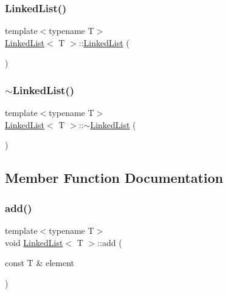 \subsubsection{\texorpdfstring{Linked\+List()}{LinkedList()}}
{\footnotesize\ttfamily template$<$typename T$>$ \\
\mbox{\hyperlink{class_linked_list}{Linked\+List}}$<$ T $>$\+::\mbox{\hyperlink{class_linked_list}{Linked\+List}} (\begin{DoxyParamCaption}{ }\end{DoxyParamCaption})\hspace{0.3cm}{\ttfamily [inline]}}

\mbox{\label{class_linked_list_a7c37609df3b83bc4eb0281b852f93fd7}} 
\subsubsection{\texorpdfstring{$\sim$\+Linked\+List()}{~LinkedList()}}
{\footnotesize\ttfamily template$<$typename T$>$ \\
\mbox{\hyperlink{class_linked_list}{Linked\+List}}$<$ T $>$\+::$\sim$\mbox{\hyperlink{class_linked_list}{Linked\+List}} (\begin{DoxyParamCaption}{ }\end{DoxyParamCaption})\hspace{0.3cm}{\ttfamily [inline]}}



\subsection{Member Function Documentation}
\mbox{\label{class_linked_list_a0083b3395050b2e601388bc7872a03d8}} 
\subsubsection{\texorpdfstring{add()}{add()}}
{\footnotesize\ttfamily template$<$typename T$>$ \\
void \mbox{\hyperlink{class_linked_list}{Linked\+List}}$<$ T $>$\+::add (\begin{DoxyParamCaption}\item[{const T \&}]{element }\end{DoxyParamCaption})\hspace{0.3cm}{\ttfamily [inline]}}

